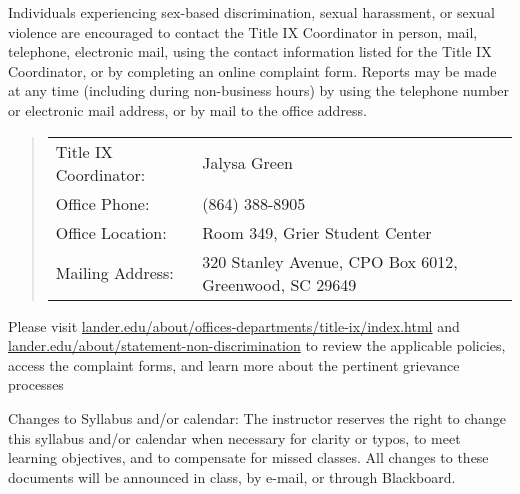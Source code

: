\documentclass{article}
\begin{document}
  Individuals experiencing sex-based discrimination, sexual harassment, or sexual violence are encouraged to contact the Title IX Coordinator in person, mail, telephone, electronic mail, using the contact information listed for the Title IX Coordinator, or by completing an online complaint form. Reports may be made at any time (including during non-business hours) by using the telephone number or electronic mail address, or by mail to the office address.

\begin{quote}
  \begin{tabular}{@{}ll@{}}
    Title IX Coordinator: & Jalysa Green\\
    Office Phone: & (864) 388-8905\\
    Office Location: & Room 349, Grier Student Center\\
    Mailing Address: & 320 Stanley Avenue, CPO Box 6012, Greenwood, SC 29649
  \end{tabular}
\end{quote}

  Please visit \href{https://www.lander.edu/about/offices-departments/title-ix/index.html}{lander.edu/about/offices-departments/title-ix/index.html} and \href{https://www.lander.edu/about/statement-non-discrimination}{lander.edu/about/\allowbreak statement\allowbreak -non\allowbreak -discrimination} to review the applicable policies, access the complaint forms, and learn more about the pertinent grievance processes

\item[Changes to Syllabus and/or calendar:]
  The instructor reserves the right to change this syllabus and/or calendar when necessary for clarity or typos, to meet learning objectives, and to compensate for missed classes. All changes to these documents will be announced in class, by e-mail, or through Blackboard.
\end{document}
